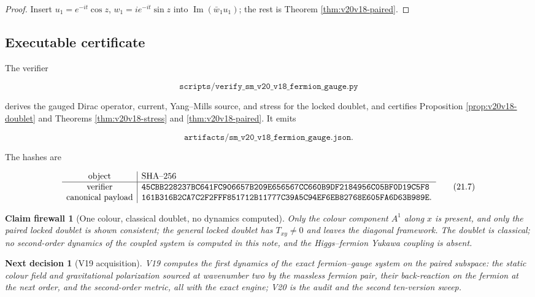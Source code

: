 \documentclass[11pt]{article}
\newtheorem{firewall}[theorem]{Claim firewall}
\newtheorem{decision}[theorem]{Next decision}
\theoremstyle{remark}
\begin{document}
\begin{proof}
Insert \(u_1=e^{-it}\cos z\), \(w_1=ie^{-it}\sin z\) into
\(\operatorname{Im}(\bar w_1u_1)\); the rest is Theorem
\ref{thm:v20v18-paired}.
\end{proof}

\subsection{Executable certificate}

The verifier

\[
 \texttt{scripts/verify\_sm\_v20\_v18\_fermion\_gauge.py}             \tag{21.5}
\]

derives the gauged Dirac operator, current, Yang--Mills source, and
stress for the locked doublet, and certifies Proposition
\ref{prop:v20v18-doublet} and Theorems \ref{thm:v20v18-stress} and
\ref{thm:v20v18-paired}.  It emits

\[
 \texttt{artifacts/sm\_v20\_v18\_fermion\_gauge.json}.                \tag{21.6}
\]

The hashes are

\[
\begin{array}{c|l}
\hbox{object}&\hbox{SHA--256}\\ \hline
\hbox{verifier}&
\texttt{45CBB228237BC641FC906657B209E656567CC660B9DF2184956C05BF0D19C5F8}\\
\hbox{canonical payload}&
\texttt{161B316B2CA7C2F2FFF851712B11777C39A5C94EF6EB82768E605FA6D63B989E}.
\end{array}                                                     \tag{21.7}
\]

\begin{firewall}[One colour, classical doublet, no dynamics computed]
\label{fire:v20v18}
Only the colour component \(A^1\) along \(x\) is present, and only the
paired locked doublet is shown consistent; the general locked doublet
has \(T_{xy}\neq0\) and leaves the diagonal framework.  The doublet is
classical; no second-order dynamics of the coupled system is computed
in this note, and the Higgs--fermion Yukawa coupling is absent.
\end{firewall}

\begin{decision}[V19 acquisition]
\label{dec:v20v18-next}
V19 computes the first dynamics of the exact fermion--gauge system on
the paired subspace: the static colour field and gravitational
polarization sourced at wavenumber two by the massless fermion pair,
their back-reaction on the fermion at the next order, and the
second-order metric, all with the exact engine; V20 is the audit and
the second ten-version sweep.
\end{decision}
\end{document}
